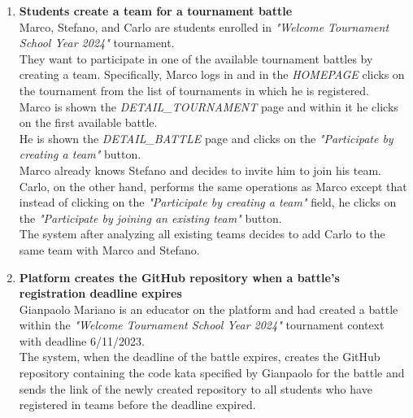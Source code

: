 \begin{enumerate}
		\item \textbf{Students create a team for a tournament battle}\\
Marco, Stefano, and Carlo are students enrolled in \emph{"Welcome Tournament School Year 2024"} tournament.\\
They want to participate in one of the available tournament battles by creating a team.
Specifically, Marco logs in and in the \emph{HOMEPAGE} clicks on the tournament from the list of tournaments in which he is registered.\\
Marco is shown the \emph{DETAIL\_TOURNAMENT} page and within it he clicks on the first available battle.\\
He is shown the \emph{DETAIL\_BATTLE} page and clicks on the \emph{"Participate by creating a team"} button.\\
Marco already knows Stefano and decides to invite him to join his team.\\
Carlo, on the other hand, performs the same operations as Marco except that instead of clicking on the \emph{"Participate by creating a team"} field, he clicks on the \emph{"Participate by joining an existing team"} button.\\
The system after analyzing all existing teams decides to add Carlo to the same team with Marco and Stefano.
		
		\item \textbf{Platform creates the GitHub repository when a battle's registration deadline expires}\\
Gianpaolo Mariano is an educator on the platform and had created a battle within the \emph{"Welcome Tournament School Year 2024"} tournament context with deadline 6/11/2023.\\
The system, when the deadline of the battle expires, creates the GitHub repository containing the code kata specified by Gianpaolo for the battle and sends the link of the newly created repository to all students who have registered in teams before the deadline expired.



\end{enumerate}
